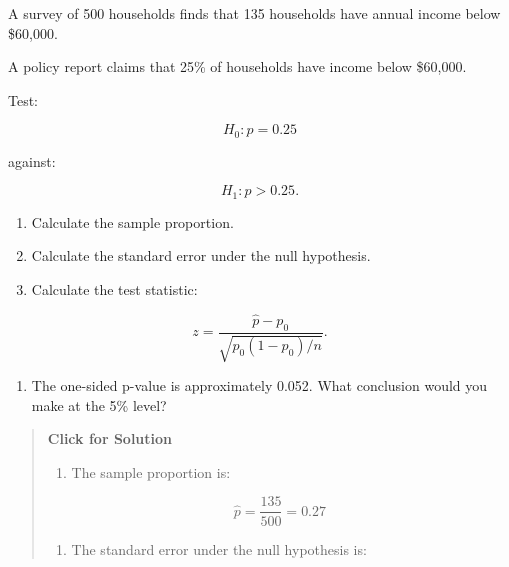 \documentclass[
  letterpaper,
  DIV=11,
  numbers=noendperiod]{scrreprt}
\providecommand{\tightlist}{%
  \setlength{\itemsep}{0pt}\setlength{\parskip}{0pt}}
\begin{document}
\begin{tcolorbox}[enhanced jigsaw, arc=.35mm, bottomrule=.15mm, bottomtitle=1mm, breakable, colback=white, colbacktitle=quarto-callout-note-color!10!white, colframe=quarto-callout-note-color-frame, coltitle=black, left=2mm, leftrule=.75mm, opacityback=0, opacitybacktitle=0.6, rightrule=.15mm, title=\textcolor{quarto-callout-note-color}{\faInfo}\hspace{0.5em}{Question 10}, titlerule=0mm, toprule=.15mm, toptitle=1mm]

A survey of 500 households finds that 135 households have annual income
below \$60,000.

A policy report claims that 25\% of households have income below
\$60,000.

Test:

\[
H_0: p = 0.25
\]

against:

\[
H_1: p > 0.25.
\]

\begin{enumerate}
\def\labelenumi{\alph{enumi}.}
\tightlist
\item
  Calculate the sample proportion.\\
\item
  Calculate the standard error under the null hypothesis.\\
\item
  Calculate the test statistic:
\end{enumerate}

\[
z =
\frac{\hat{p} - p_0}{\sqrt{p_0(1-p_0)/n}}.
\]

\begin{enumerate}
\def\labelenumi{\alph{enumi}.}
\setcounter{enumi}{3}
\tightlist
\item
  The one-sided p-value is approximately 0.052. What conclusion would
  you make at the 5\% level?
\end{enumerate}

\begin{quote}
\textbf{Click for Solution}

\begin{enumerate}
\def\labelenumi{\alph{enumi}.}
\tightlist
\item
  The sample proportion is:
\end{enumerate}

\[
\hat{p}
=
\frac{135}{500}
=
0.27
\]

\begin{enumerate}
\def\labelenumi{\alph{enumi}.}
\setcounter{enumi}{1}
\tightlist
\item
  The standard error under the null hypothesis is:
\end{enumerate}


\end{quote}
\end{tcolorbox}
\end{document}

